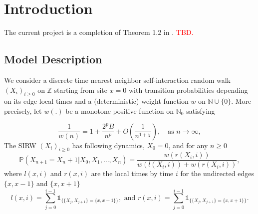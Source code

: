 \documentclass[twoside,12pt,a4paper]{article}
\numberwithin{equation}{section}
\newcommand\TBD{\textcolor{red}{TBD.}}
\begin{document}
	\maketitle
	
	\begin{abstract}
		This document is an outline of the article for the Scaling limit of SIRW. We complete the functional CLT in \cite{KMP22} for the asymptotically free self-interacting random walk (AF-SIRW) in the case $0<p \leq \frac{1}{2}$. The approach is to carefully approximate the local drifts of the random walk via the study of the directed edge local times, which are described by branching-like processes and generalized Ray-knight Theorems. Xiaoyu Liu and Zhe Wang are working on this project. 
		\TBD
	\end{abstract}
	
	\section{Introduction}
	The current project is a completion of Theorem 1.2 in \cite{KMP22}. 
	\TBD 
	
	
	\subsection{Model Description} 
	We consider a discrete time nearest neighbor self-interaction random walk $(X_i)_{i\geq 0}$ on $\mathbb{Z}$ starting from site $x=0$ with transition probabilities depending on its edge local times and a (deterministic) weight function $w$ on $\mathbb{N}\cup \{0\}$. More precisely, let $w(.)$ be a monotone positive function on $\mathbb{N}_0$ satisfying
	
	
	\begin{equation}\label{eq: asymptotics of w}
		\frac{1}{w(n)} = 1+\frac{2^p B}{n^p} + O\left(\frac{1}{n^{1+\mathcal{\chi}}}\right), \quad \mbox{as $n\to \infty$}, 	
	\end{equation} 
	The SIRW $(X_i)_{i\geq 0}$ has following dynamics, 
	$X_0 = 0$, and for any $n\geq 0$
	\begin{equation}\label{dynamic}
		\mathbb{P}\left( X_{n+1} =  X_n +1 | X_0,X_1,\dots,X_n   \right) =  \frac{  w(r(X_i,i) )}{ w(l(X_i,i))  + w(r(X_i,i))   },
	\end{equation}
	where $l(x,i)$ and $r(x,i)$ are the local times by time $i$ for the undirected edges $\{x,x-1\}$ and $\{x,x+1\}$
	$$ l(x,i) = \sum_{j=0}^{i-1} \mathbb{1}_{ \{  \{X_j, X_{j+1}\} =  \{x,x-1\} \} }, \mbox{ and }  r(x,i) = \sum_{j=0}^{i-1} \mathbb{1}_{ \{  \{X_j, X_{j+1}\} =  \{x,x+1\} \} }.        $$
	
\end{document}
